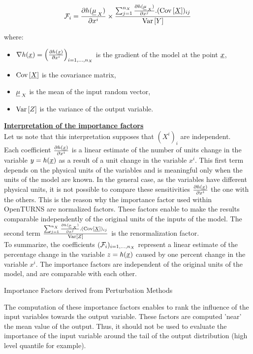 {  \begin{align*}
    {\mathcal F}_i = \frac{\partial h(\underline{\mu}_{\:X})}{\partial x^i} \times \frac{\sum_{j=1}^{n_X} \frac{\partial h(\underline{\mu}_{\:X})}{\partial x^j}.({\rm Cov}\left[ \underline{X} \right])_{ij} }{{\rm Var}\left[ Y \right]}
  \end{align*}

  where:
  \begin{itemize}
  \item $\nabla h(\underline{x}) = \left( \frac{\partial h(\underline{x})}{\partial x^i}\right)_{i=1,\ldots,n_X}$ is the gradient of the model at the point $\underline{x}$,
  \item ${\rm Cov}\left[ \underline{X} \right]$ is the covariance matrix,
  \item $\underline{\mu}_{\:X}$ is the mean of the input random vector,
  \item ${\rm Var}\left[ Z \right]$ is the variance of the output variable.
  \end{itemize}

  \textbf{\underline{Interpretation of the importance factors}}\\

  Let us note that this interpretation supposes that $(X^i)_i$ are independent.\\

  Each coefficient $\frac{\partial h(\underline{x})}{\partial x^i}$ is a linear estimate of the number of units change in the variable $y=h(\underline{x})$ as a result of a unit change in the variable $x^i$. This first term depends on the physical units of the variables and is  meaningful only when the units of the model are known. In the general case, as the variables have different physical units, it is not possible to compare these sensitivities $\frac{\partial h(\underline{x})}{\partial x^i}$ the one with the others. This is the reason why the importance factor used within OpenTURNS are normalized factors. These factors enable to make the results comparable independently of the original units of the inputs of the model. The second term $\frac{\sum_{j=1}^{n_X} \frac{\partial h(\underline{\mu}_{\:X})}{\partial x^j}.({\rm Cov}\left[ \underline{X} \right])_{ij} }{{\rm Var}\left[ Z \right]}$ is the renormalization factor.\\

  To summarize, the coefficients $({\mathcal F}_i)_{i=1,\ldots,n_X}$ represent a linear estimate of the percentage change in the variable $z = h(\underline{x})$ caused by one percent change in the variable $x^i$. The importance factors are independent of the original units of the model, and are comparable with each other.

}
{
  Importance Factors derived from Perturbation Methods
}

{
  The computation of these importance factors enables to rank the influence of the input variables towards the output variable. These factors are computed 'near' the mean value of the output. Thus, it should not be used to evaluate the importance of the input variable around the tail of the output distribution (high level quantile for example).
}

\Example{
  --
}
